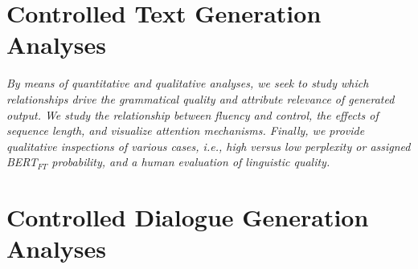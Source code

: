 






\section{Controlled Text Generation Analyses}
\label{sec:exp2_analyses}

\textit{By means of quantitative and qualitative analyses, we seek to study which relationships drive the grammatical quality and attribute relevance of generated output. We study the relationship between fluency and control, the effects of sequence length, and visualize attention mechanisms. Finally, we provide qualitative inspections of various cases, i.e., high versus low perplexity or assigned BERT$_{FT}$ probability, and a human evaluation of linguistic quality.}


\section{Controlled Dialogue Generation Analyses}

